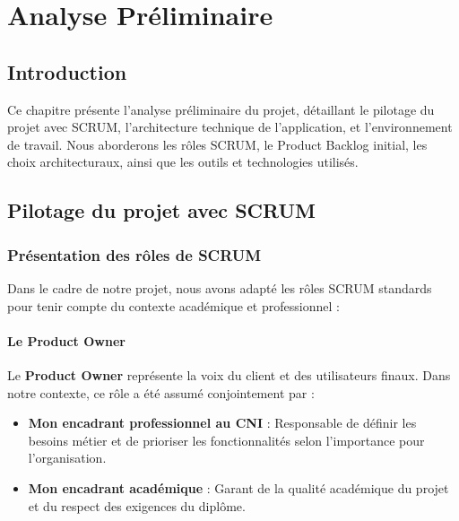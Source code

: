 \documentclass[12pt,a4paper]{report}
\begin{document}

\chapter{Analyse Préliminaire}

\section*{Introduction}

Ce chapitre présente l'analyse préliminaire du projet, détaillant le pilotage du projet avec SCRUM, l'architecture technique de l'application, et l'environnement de travail. Nous aborderons les rôles SCRUM, le Product Backlog initial, les choix architecturaux, ainsi que les outils et technologies utilisés.

\section{Pilotage du projet avec SCRUM}

\subsection{Présentation des rôles de SCRUM}

Dans le cadre de notre projet, nous avons adapté les rôles SCRUM standards pour tenir compte du contexte académique et professionnel :

\subsubsection{Le Product Owner}

Le \textbf{Product Owner} représente la voix du client et des utilisateurs finaux. Dans notre contexte, ce rôle a été assumé conjointement par :

\begin{itemize}[leftmargin=1cm]
    \item \textbf{Mon encadrant professionnel au CNI} : Responsable de définir les besoins métier et de prioriser les fonctionnalités selon l'importance pour l'organisation.
    
    \item \textbf{Mon encadrant académique} : Garant de la qualité académique du projet et du respect des exigences du diplôme.
\end{itemize}
\end{document}
